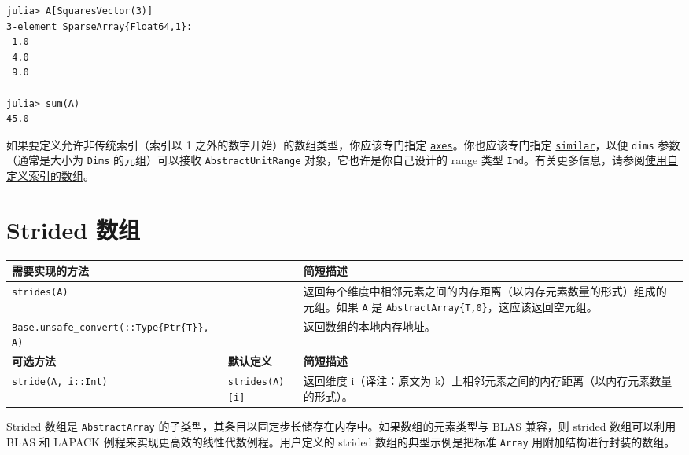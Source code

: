\begin{verbatim}
julia> A[SquaresVector(3)]
3-element SparseArray{Float64,1}:
 1.0
 4.0
 9.0

julia> sum(A)
45.0
\end{verbatim}



如果要定义允许非传统索引（索引以 1 之外的数字开始）的数组类型，你应该专门指定 \hyperlink{7074821531920287868}{\texttt{axes}}。你也应该专门指定 \hyperlink{15525808546723795098}{\texttt{similar}}，以便 \texttt{dims} 参数（通常是大小为 \texttt{Dims} 的元组）可以接收 \texttt{AbstractUnitRange} 对象，它也许是你自己设计的 range 类型 \texttt{Ind}。有关更多信息，请参阅\hyperlink{1238988360302116626}{使用自定义索引的数组}。



\hypertarget{2800090857858949975}{}


\section{Strided 数组}




\begin{table}[h]

\begin{tabulary}{\linewidth}{|L|L|L|}
\hline
需要实现的方法 &  & 简短描述 \\
\hline
\texttt{strides(A)} &  & 返回每个维度中相邻元素之间的内存距离（以内存元素数量的形式）组成的元组。如果 \texttt{A} 是 \texttt{AbstractArray\{T,0\}}，这应该返回空元组。 \\
\hline
\texttt{Base.unsafe\_convert(::Type\{Ptr\{T\}\}, A)} &  & 返回数组的本地内存地址。 \\
\hline
\textbf{可选方法} & \textbf{默认定义} & \textbf{简短描述} \\
\hline
\texttt{stride(A, i::Int)} & \texttt{strides(A)[i]} & 返回维度 i（译注：原文为 k）上相邻元素之间的内存距离（以内存元素数量的形式）。 \\
\hline
\end{tabulary}

\end{table}



Strided 数组是 \texttt{AbstractArray} 的子类型，其条目以固定步长储存在内存中。如果数组的元素类型与 BLAS 兼容，则 strided 数组可以利用 BLAS 和 LAPACK 例程来实现更高效的线性代数例程。用户定义的 strided 数组的典型示例是把标准 \texttt{Array} 用附加结构进行封装的数组。



